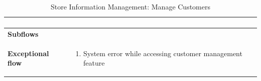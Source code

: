 \documentclass[../thesis.tex]{subfiles}
\begin{document}
\begin{center}
\begin{table}[H]
{\begin{tabular}[htbp]{|p{}|p{}|}
\begin{enumerate}
                                                   \end{enumerate} \\ \hline
                \textbf{Subflows              }  &                                                                                   \\ \hline
                \textbf{Exceptional flow       } & \begin{enumerate}
                                                       \item System error while accessing customer management feature
                                                   \end{enumerate}      \\ \hline
            \end{tabular}%
        }
        \caption{Store Information Management: Manage Customers}
        \label{tab:table-usecase-manage-customers}
    \end{table}
\end{center}
\end{document}
